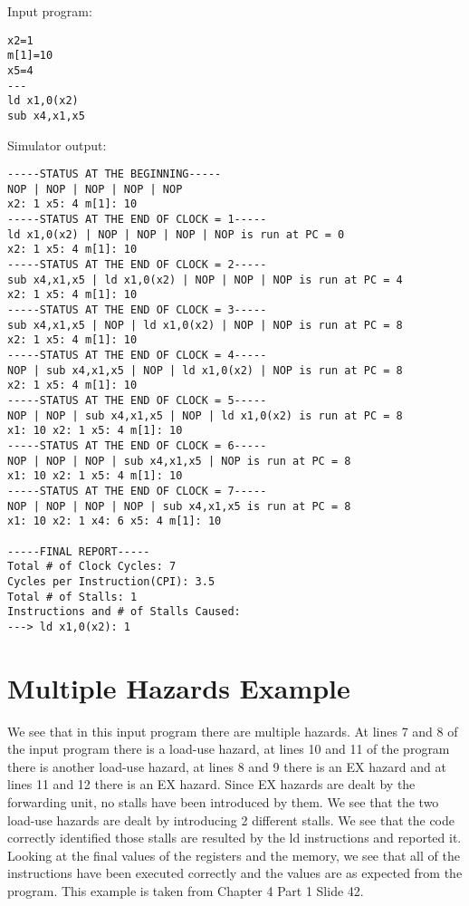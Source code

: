 \noindent Input program:
\vspace{0.5 cm}
\begin{lstlisting}
x2=1
m[1]=10
x5=4
---
ld x1,0(x2)
sub x4,x1,x5

\end{lstlisting}
\vspace{0.5 cm}
Simulator output:
\vspace{0.5 cm}
\begin{lstlisting}
-----STATUS AT THE BEGINNING-----
NOP | NOP | NOP | NOP | NOP
x2: 1 x5: 4 m[1]: 10 
-----STATUS AT THE END OF CLOCK = 1-----
ld x1,0(x2) | NOP | NOP | NOP | NOP is run at PC = 0
x2: 1 x5: 4 m[1]: 10 
-----STATUS AT THE END OF CLOCK = 2-----
sub x4,x1,x5 | ld x1,0(x2) | NOP | NOP | NOP is run at PC = 4
x2: 1 x5: 4 m[1]: 10 
-----STATUS AT THE END OF CLOCK = 3-----
sub x4,x1,x5 | NOP | ld x1,0(x2) | NOP | NOP is run at PC = 8
x2: 1 x5: 4 m[1]: 10 
-----STATUS AT THE END OF CLOCK = 4-----
NOP | sub x4,x1,x5 | NOP | ld x1,0(x2) | NOP is run at PC = 8
x2: 1 x5: 4 m[1]: 10 
-----STATUS AT THE END OF CLOCK = 5-----
NOP | NOP | sub x4,x1,x5 | NOP | ld x1,0(x2) is run at PC = 8
x1: 10 x2: 1 x5: 4 m[1]: 10 
-----STATUS AT THE END OF CLOCK = 6-----
NOP | NOP | NOP | sub x4,x1,x5 | NOP is run at PC = 8
x1: 10 x2: 1 x5: 4 m[1]: 10 
-----STATUS AT THE END OF CLOCK = 7-----
NOP | NOP | NOP | NOP | sub x4,x1,x5 is run at PC = 8
x1: 10 x2: 1 x4: 6 x5: 4 m[1]: 10 

-----FINAL REPORT-----
Total # of Clock Cycles: 7
Cycles per Instruction(CPI): 3.5
Total # of Stalls: 1
Instructions and # of Stalls Caused: 
---> ld x1,0(x2): 1
\end{lstlisting}

\section{Multiple Hazards Example}
We see that in this input program there are multiple hazards. At lines 7 and 8 of the input program there is a load-use hazard, at lines 10 and 11 of the program there is another load-use hazard, at lines 8 and 9 there is an EX hazard and at lines 11 and 12 there is an EX hazard. Since EX hazards are dealt by the forwarding unit, no stalls have been introduced by them. We see that the two load-use hazards are dealt by introducing 2 different stalls. We see that the code correctly identified those stalls are resulted by the ld instructions and reported it. Looking at the final values of the registers and the memory, we see that all of the instructions have been executed correctly and the values are as expected from the program. This example is taken from Chapter 4 Part 1 Slide 42.
\\

